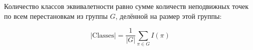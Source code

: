 Количество классов эквивалетности равно сумме количеств неподвижных точек по всем перестановкам из группы $G$, делённой на размер этой группы:

$$|\text{Classes}| = \frac{1}{|G|} \sum_{\pi \in G} I(\pi)$$